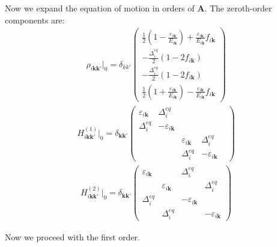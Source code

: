 \documentclass[aps,prb,reprint,noeprint,superscriptaddress]{revtex4-1}
\begin{document}
Now we expand the equation of motion in orders of $\mathbf{A}$. The zeroth-order
components are:
\begin{eqnarray*}
  \rho_{i\mathbf{kk'}}\big|_0 = \delta_{kk'} 
  \begin{pmatrix}
    \frac{1}{2}\left(1-\frac{\varepsilon_{i\mathbf{k}}}{E_{i\mathbf{k}}}\right)
    +\frac{\varepsilon_{i\mathbf{k}}}{ E_{i\mathbf{k}}}f_{i\mathbf{k}}
    \\
    -\frac{\Delta^{eq}_i}{2}(1-2f_{i\mathbf{k}})
    \\
    -\frac{\Delta^{eq}_i}{2}(1-2f_{i\mathbf{k}})
    \\
    \frac{1}{2}\left(1+\frac{\varepsilon_{i\mathbf{k}}}{E_{i\mathbf{k}}}\right)
    -\frac{\varepsilon_{i\mathbf{k}}}{ E_{i\mathbf{k}}}f_{i\mathbf{k}}
  \end{pmatrix}
\end{eqnarray*}
\begin{eqnarray*}
  H_{i\mathbf{kk'}}^{(1)}\big|_0
  =
  \delta_{\mathbf{kk'}}
  \begin{pmatrix}
    \varepsilon_{i\mathbf{k}} & \Delta^{eq}_i & & \\
    \Delta^{eq}_i & -\varepsilon_{i\mathbf{k}} & & \\
    && \varepsilon_{i\mathbf{k}} & \Delta^{eq}_i \\
    && \Delta^{eq}_i & -\varepsilon_{i\mathbf{k}} & 
  \end{pmatrix}
\end{eqnarray*}
\begin{eqnarray*}
  H_{i\mathbf{kk'}}^{(2)}\big|_0
  =
  \delta_{\mathbf{kk'}}
  \begin{pmatrix}
    \varepsilon_{i\mathbf{k}} && \Delta^{eq}_i & \\
    & \varepsilon_{i\mathbf{k}} && \Delta^{eq}_i \\
    \Delta^{eq}_i && -\varepsilon_{i\mathbf{k}} & \\
    & \Delta^{eq}_i && -\varepsilon_{i\mathbf{k}}
  \end{pmatrix}
\end{eqnarray*}

Now we proceed with the first order.
\end{document}
